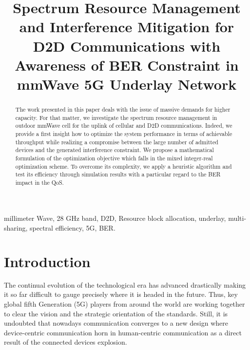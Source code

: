 \documentclass[conference,onecolumn,12pt]{IEEEtran}
\begin{document}
\title{Spectrum Resource Management and Interference Mitigation for D2D Communications with Awareness of BER Constraint in mmWave 5G Underlay Network}


\author{
}

\maketitle

\begin{abstract}
The work presented in this paper deals with the issue of massive demands for higher capacity. For that matter, we investigate the spectrum resource management in outdoor mmWave cell for the uplink of cellular and D2D communications. Indeed, we provide a first insight how to optimize the system performance in terms of achievable throughput while realizing a compromise between the large number of admitted devices and the generated interference constraint. We propose a mathematical formulation of the optimization objective which falls in the mixed integer-real optimization scheme. To overcome its complexity, we apply a heuristic algorithm and test its efficiency through simulation results with a particular regard to the BER impact in the QoS. \end{abstract}

\begin{IEEEkeywords}
millimeter Wave, 28 GHz band, D2D, Resource block allocation, underlay, multi-sharing, spectral efficiency, 5G, BER.
\end{IEEEkeywords}
\IEEEpeerreviewmaketitle
\section{Introduction}
The continual evolution of the technological era has advanced drastically making it so far difficult to gauge precisely where it is headed in the future. Thus, key global fifth Generation (5G) players from around the world are working together to clear the vision and the strategic orientation of the standards. Still, it is undoubted that nowadays communication converges to a new design where device-centric communication horn in human-centric communication as a direct result of the connected devices explosion.
\end{document}
